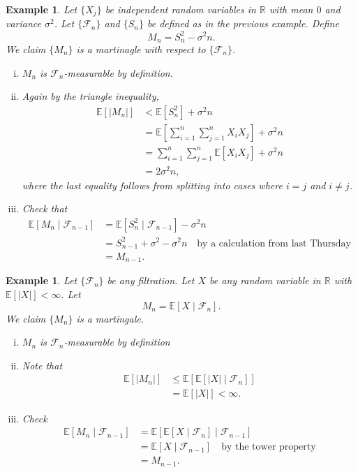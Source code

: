 \documentclass{tufte-handout}
\newcommand*\R{\mathbb{R}}
\newcommand*\E{\mathbb{E}}
\newtheorem{ex}[thm]{Example}
\theoremstyle{definition}
\begin{document}
\begin{ex}
	Let $\{X_j\}$ be independent random variables in $\R$ with mean $0$ and variance $\sigma^2$. Let $\{\mathscr{F}_n\}$ and $\{S_n\}$ be defined as in the previous example. Define \[
		M_n = S_n^2 - \sigma^2 n
	.\] We claim $\{M_n\}$ is a martinagle with respect to $\{\mathscr{F}_n\}$.

	\begin{enumerate}[(i)]
		\item $M_n$ is $\mathscr{F}_n$-measurable by definition.
		\item Again by the triangle inequality, 
			\begin{align*}
				\E\left[\left| M_n \right|\right] &< \E\left[S_n^2\right] + \sigma^2 n \\
												  &= \E\left[\sum\limits_{i=1}^{n} \sum\limits_{j=1}^{n} X_i X_j \right] + \sigma^2 n \\
												  &= \sum\limits_{i=1}^{n} \sum\limits_{j=1}^{n} \E\left[X_i X_j\right] + \sigma^2 n  \\
												  &= 2\sigma^2 n			
			,\end{align*}
			where the last equality follows from splitting into cases where $i=j$ and $i\ne j$.
		\item Check that
			\begin{align*}
				\E\left[M_n \mid \mathscr{F}_{n-1}\right] &= \E\left[S_n^2 \mid \mathscr{F}_{n-1}\right] -\sigma^2 n \\
				&= S_{n-1}^2 + \sigma^2 - \sigma^2 n \quad \text{by a calculation from last Thursday} \\
				&= M_{n-1}
			.\end{align*}
	\end{enumerate}
\end{ex}

\begin{ex}
	Let $\{\mathscr{F}_n\}$ be any filtration. Let $X$ be any random variable in $\R$ with $\E\left[\left| X \right|\right] < \infty$. Let \[
		M_n = \E\left[X \mid \mathscr{F}_n\right] 
	.\] We claim $\{M_n\}$ is a martingale.

	\begin{enumerate}[(i)]
		\item $M_n$ is $\mathscr{F}_n$-measurable by definition
		\item Note that
			\begin{align*}
				\E\left[\left| M_n \right|\right] &\le \E\left[\E\left[\left| X \right|\mid \mathscr{F}_n\right] \right] \\
				&= \E\left[\left| X \right|\right] < \infty
			.\end{align*}
		\item Check 
			\begin{align*}
				\E\left[M_n \mid \mathscr{F}_{n-1}\right] &= \E\left[\E\left[X \mid \mathscr{F}_n\right] \mid \mathscr{F}_{n-1}\right]  \\
														  &= \E\left[X \mid \mathscr{F}_{n-1}\right] \quad \text{by the tower property} \\
														  &= M_{n-1}
			.\end{align*}
	\end{enumerate}
\end{ex}
\end{document}
